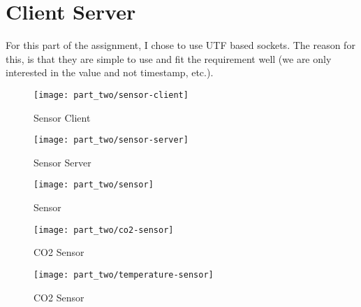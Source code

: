 \section{Client Server}
For this part of the assignment, I chose to use UTF based sockets. The reason
for this, is that they are simple to use and fit the requirement well (we are
only interested in the value and not timestamp, etc.).

\begin{figure}
\caption{Sensor Client}
\centering
\texttt{[image: part\_two/sensor-client]}
\end{figure}

\begin{figure}
\caption{Sensor Server}
\centering
\texttt{[image: part\_two/sensor-server]}
\end{figure}

\begin{figure}
\caption{Sensor}
\centering
\texttt{[image: part\_two/sensor]}
\end{figure}

\begin{figure}
\caption{CO2 Sensor}
\centering
\texttt{[image: part\_two/co2-sensor]}
\end{figure}

\begin{figure}
\caption{CO2 Sensor}
\centering
\texttt{[image: part\_two/temperature-sensor]}
\end{figure}
